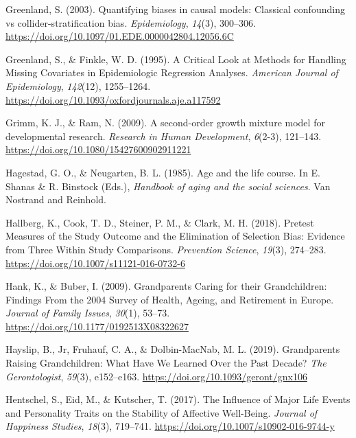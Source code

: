 \documentclass[
  english,
  man, noextraspace]{apa7}
\begin{document}
\leavevmode\hypertarget{ref-greenlandQuantifyingBiasesCausal2003}{}%
Greenland, S. (2003). Quantifying biases in causal models: Classical confounding vs collider-stratification bias. \emph{Epidemiology}, \emph{14}(3), 300--306. \url{https://doi.org/10.1097/01.EDE.0000042804.12056.6C}

\leavevmode\hypertarget{ref-greenlandCriticalLookMethods1995}{}%
Greenland, S., \& Finkle, W. D. (1995). A Critical Look at Methods for Handling Missing Covariates in Epidemiologic Regression Analyses. \emph{American Journal of Epidemiology}, \emph{142}(12), 1255--1264. \url{https://doi.org/10.1093/oxfordjournals.aje.a117592}

\leavevmode\hypertarget{ref-grimmSecondorderGrowthMixture2009}{}%
Grimm, K. J., \& Ram, N. (2009). A second-order growth mixture model for developmental research. \emph{Research in Human Development}, \emph{6}(2-3), 121--143. \url{https://doi.org/10.1080/15427600902911221}

\leavevmode\hypertarget{ref-hagestadAgeLifeCourse1985}{}%
Hagestad, G. O., \& Neugarten, B. L. (1985). Age and the life course. In E. Shanas \& R. Binstock (Eds.), \emph{Handbook of aging and the social sciences}. Van Nostrand and Reinhold.

\leavevmode\hypertarget{ref-hallbergPretestMeasuresStudy2018}{}%
Hallberg, K., Cook, T. D., Steiner, P. M., \& Clark, M. H. (2018). Pretest Measures of the Study Outcome and the Elimination of Selection Bias: Evidence from Three Within Study Comparisons. \emph{Prevention Science}, \emph{19}(3), 274--283. \url{https://doi.org/10.1007/s11121-016-0732-6}

\leavevmode\hypertarget{ref-hankGrandparentsCaringTheir2009}{}%
Hank, K., \& Buber, I. (2009). Grandparents Caring for their Grandchildren: Findings From the 2004 Survey of Health, Ageing, and Retirement in Europe. \emph{Journal of Family Issues}, \emph{30}(1), 53--73. \url{https://doi.org/10.1177/0192513X08322627}

\leavevmode\hypertarget{ref-hayslipGrandparentsRaisingGrandchildren2019}{}%
Hayslip, B., Jr, Fruhauf, C. A., \& Dolbin-MacNab, M. L. (2019). Grandparents Raising Grandchildren: What Have We Learned Over the Past Decade? \emph{The Gerontologist}, \emph{59}(3), e152--e163. \url{https://doi.org/10.1093/geront/gnx106}

\leavevmode\hypertarget{ref-hentschelInfluenceMajorLife2017}{}%
Hentschel, S., Eid, M., \& Kutscher, T. (2017). The Influence of Major Life Events and Personality Traits on the Stability of Affective Well-Being. \emph{Journal of Happiness Studies}, \emph{18}(3), 719--741. \url{https://doi.org/10.1007/s10902-016-9744-y}
\end{document}
